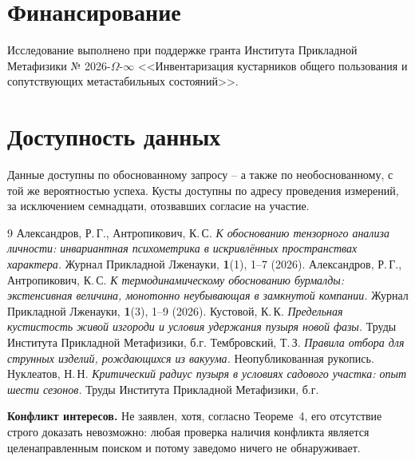\documentclass[11pt,a4paper]{article}
\begin{document}
\section*{Финансирование}
Исследование выполнено при поддержке гранта Института Прикладной Метафизики
№ 2026-$\Omega$-$\infty$ <<Инвентаризация кустарников общего пользования и сопутствующих метастабильных состояний>>.

\section*{Доступность данных}
Данные доступны по обоснованному запросу -- а также по необоснованному, с той же вероятностью успеха. Кусты доступны по адресу проведения измерений, за исключением семнадцати, отозвавших согласие на участие.

\begin{thebibliography}{9}
 Александров, Р.\,Г., Антропикович, К.\,С. \textit{К обоснованию тензорного анализа личности: инвариантная психометрика в искривлённых пространствах характера.} Журнал Прикладной Лженауки, \textbf{1}(1), 1--7 (2026).
 Александров, Р.\,Г., Антропикович, К.\,С. \textit{К термодинамическому обоснованию бурмалды: экстенсивная величина, монотонно неубывающая в замкнутой компании.} Журнал Прикладной Лженауки, \textbf{1}(3), 1--9 (2026).
 Кустовой, К.\,К. \textit{Предельная кустистость живой изгороди и условия удержания пузыря новой фазы.} Труды Института Прикладной Метафизики, б.г.
 Тембровский, Т.\,З. \textit{Правила отбора для струнных изделий, рождающихся из вакуума.} Неопубликованная рукопись.
 Нуклеатов, Н.\,Н. \textit{Критический радиус пузыря в условиях садового участка: опыт шести сезонов.} Труды Института Прикладной Метафизики, б.г.
\end{thebibliography}

\noindent\textbf{Конфликт интересов.} Не заявлен, хотя, согласно Теореме~4, его отсутствие строго доказать невозможно: любая проверка наличия конфликта является целенаправленным поиском и потому заведомо ничего не обнаруживает.
\end{document}
